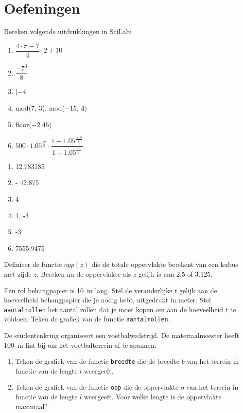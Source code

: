 \section{Oefeningen}
\begin{oef}
   Bereken volgende uitdrukkingen in SciLab: 
\begin{enumerate}
\item  $\dfrac{4\cdot \pi-7}4 \cdot 2+10$
\item $\dfrac{ -7^3}8 $
\item $| - 4| $
\item mod(7, 3), mod($ -15$, 4) 
\item floor($-2.45$) 
\item $500\cdot 1.05^\frac{12}2\cdot \dfrac{1-1.05^\frac{-13}2}{1-1.05^\frac{-1}2} $
\end{enumerate}
   \begin{opl}
\begin{enumerate}
\item  12.783185	
\item - 42.875
\item 4
\item 1, -3 
\item -3
\item 7555.9475
\end{enumerate}
   \end{opl}
\end{oef}

\begin{oef}
Definieer de functie $opp(z)$ die de totale oppervlakte berekent 
van een kubus met zijde $z$. Bereken nu de oppervlakte 
als $z$ gelijk is aan \num{2.5} of \num{3.125}. 
\end{oef}

\begin{oef}
      Een rol behangpapier is \SI{10}{\meter} lang. Stel de veranderlijke  $t$ gelijk aan de hoeveelheid behangpapier die je nodig hebt, uitgedrukt in meter. Stel \verb/aantalrollen/ het aantal rollen dat je moet kopen om aan de  hoeveelheid $t$ te voldoen. Teken de grafiek van de functie \verb/aantalrollen/.
\end{oef}


\begin{oef}
De studentenkring organiseert een voetbalwedstrijd. De materiaalmeester heeft \SI{100}{\meter} lint bij om het voetbalterrein af te spannen. 
\begin{enumerate}
\item Teken de grafiek van de functie \verb/breedte/ die de breedte $b$ van het terrein in functie van de lengte $l$ weergeeft.
\item Teken de grafiek van de functie \verb/opp/ die de oppervlakte $o$ van het terrein in functie van de lengte $l$ weergeeft. Voor welke lengte is de oppervlakte maximaal?
\end{enumerate}
\end{oef}

